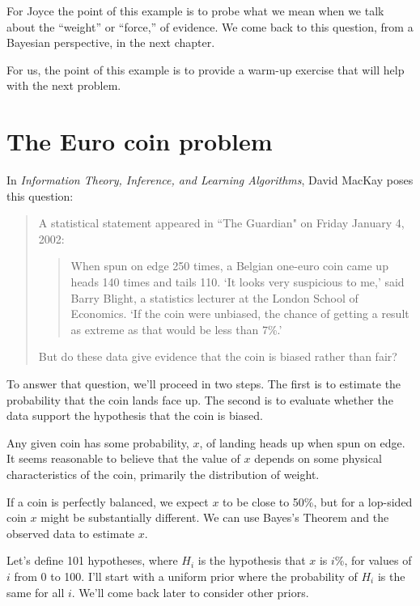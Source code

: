 \documentclass[12pt]{book}
\begin{document}
For Joyce the point of this example is to probe what we mean
when we talk about the ``weight'' or ``force,'' of
evidence.  We come back to this question, from a Bayesian
perspective, in the next chapter.

For us, the point of this example is to provide a warm-up exercise
that will help with the next problem.


\section{The Euro coin problem}
\label{euro}

In {\it Information Theory, Inference, and Learning Algorithms}, David MacKay
poses this question:

\begin{quote}
A statistical statement appeared in ``The Guardian" on Friday January 4, 2002:

  \begin{quote}
        When spun on edge 250 times, a Belgian one-euro coin came
        up heads 140 times and tails 110.  `It looks very suspicious
        to me,' said Barry Blight, a statistics lecturer at the London
        School of Economics.  `If the coin were unbiased, the chance of
        getting a result as extreme as that would be less than 7\%.'
        \end{quote}

But do these data give evidence that the coin is biased rather than fair?
\end{quote}

To answer that question, we'll proceed in two steps.  The first
is to estimate the probability that the coin lands face up.  The second
is to evaluate whether the data support the hypothesis that the
coin is biased.

Any given coin has some probability, $x$, of landing heads up when spun
on edge.  It seems reasonable to believe that the value of $x$ depends
on some physical characteristics of the coin, primarily the distribution
of weight.

If a coin is perfectly balanced, we expect $x$ to be close to 50\%, but
for a lop-sided coin $x$ might be substantially different.  We can use
Bayes's Theorem and the observed data to estimate $x$.

Let's define 101 hypotheses, where $H_i$ is the hypothesis that
$x$ is $i$\%, for values of $i$ from 0 to 100.  I'll start with a uniform
prior where the probability of $H_i$ is the same for all $i$.  We'll
come back later to consider other priors.
\end{document}
